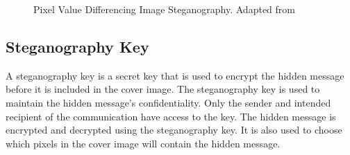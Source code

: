 \begin{figure}[ht!]
\centering
{}
\caption{Pixel Value Differencing Image Steganography. Adapted from \cite{article1}}
\end{figure}

 \subsection{Steganography Key}
A steganography key is a secret key that is used to encrypt the hidden message before it is included in the cover image. The steganography key is used to maintain the hidden message's confidentiality. Only the sender and intended recipient of the communication have access to the key. The hidden message is encrypted and decrypted using the steganography key. It is also used to choose which pixels in the cover image will contain the hidden message.

